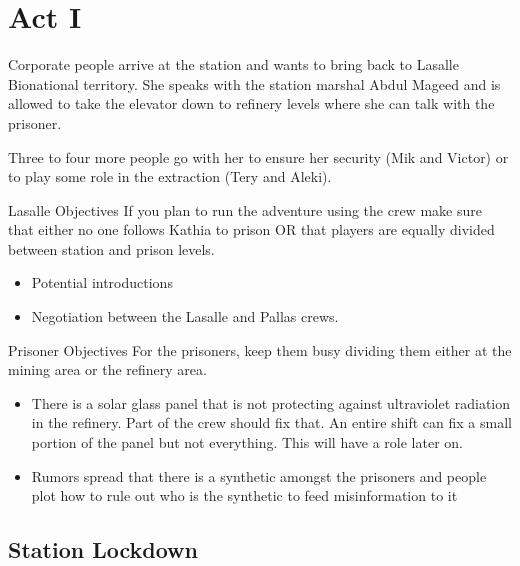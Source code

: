 \chapter{Act I}


Corporate people arrive at the station and  wants to bring  back to Lasalle Bionational territory. She speaks with the station marshal Abdul Mageed and is allowed to take the elevator down to refinery levels where she can talk with the prisoner.

Three to four more people go with her to ensure her security (Mik and Victor) or to play some role in the extraction (Tery and Aleki). 





\medskip
\begin{rpg-commentbox}{Lasalle Objectives}
If you plan to run the adventure using the crew make sure that either no one follows Kathia to prison OR that players are equally divided between station and prison levels.

\begin{itemize}
    \item Potential introductions

    \item Negotiation between the Lasalle and Pallas crews. 
\end{itemize}
\end{rpg-commentbox}



\medskip
\begin{rpg-commentbox}{Prisoner Objectives}
For the prisoners, keep them busy dividing them either at the mining area or the refinery area.

\begin{itemize}
    \item There is a solar glass panel that is not protecting against ultraviolet radiation in the refinery. Part of the crew should fix that. An entire shift can fix a small portion of the panel but not everything. This will have a role later on.

    \item Rumors spread that there is a synthetic amongst the prisoners and people plot how to rule out who is the synthetic to feed misinformation to it 
\end{itemize}
\end{rpg-commentbox}


\newsect

\section{Station Lockdown}



